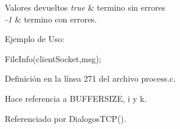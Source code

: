\begin{DoxyRetVals}{Valores devueltos}
{\em true} & termino sin errores \\
\hline
{\em -\/1} & termino con errores.\\
\hline
\end{DoxyRetVals}
Ejemplo de Uso: 
\begin{DoxyCode}
                
                FileInfo(clientSocket,msg);  
\end{DoxyCode}
 

Definición en la línea 271 del archivo process.c.



Hace referencia a BUFFERSIZE, i y k.



Referenciado por DialogosTCP().


